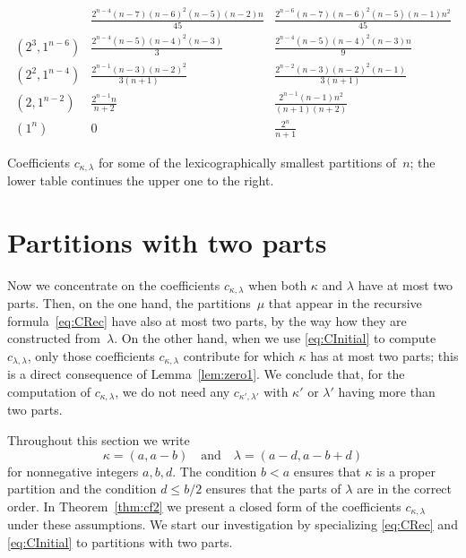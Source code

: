 \documentclass[10pt,oneside,american]{amsart}
\numberwithin{equation}{section}
\numberwithin{figure}{section}
\theoremstyle{plain}
\theoremstyle{definition}
\theoremstyle{remark}
\theoremstyle{plain}
\theoremstyle{definition}
\theoremstyle{plain}
\theoremstyle{plain}
\begin{document}
\begin{table}[H]
\[\begin{array}{c|cc}
    & \frac{2^{n-4} (n-7) (n-6)^2 (n-5) (n-2) n}{45}
    & \frac{2^{n-6} (n-7) (n-6)^2 (n-5) (n-1) n^2}{45}
    \\[1ex]
    (2^3,1^{n-6})
    & \frac{2^{n-4} (n-5) (n-4)^2 (n-3)}{3}
    & \frac{2^{n-4} (n-5) (n-4)^2 (n-3) n}{9}
    \\[1ex]
    (2^2,1^{n-4})
    & \frac{2^{n-1} (n-3) (n-2)^2}{3 (n+1)}
    & \frac{2^{n-2} (n-3) (n-2)^2 (n-1)}{3 (n+1)}
    \\[1ex]
    (2,1^{n-2})
    & \frac{2^{n-1} n}{n+2}
    & \frac{2^{n-1} (n-1) n^2}{(n+1) (n+2)}
    \\[1ex]
    (1^n)
    & 0 & \frac{2^n}{n+1}
\end{array}
\]
\caption{Coefficients $c_{\kappa,\lambda}$ for some of the lexicographically
  smallest partitions of~$n$; the lower table continues the upper one to the
  right.}
\label{tab:cn2}
\end{table}


\section{Partitions with two parts}

Now we concentrate on the coefficients $c_{\kappa,\lambda}$ when both $\kappa$
and $\lambda$ have at most two parts. Then, on the one hand, the
partitions~$\mu$ that appear in the recursive formula~\eqref{eq:CRec} have
also at most two parts, by the way how they are constructed from~$\lambda$. On
the other hand, when we use \eqref{eq:CInitial} to compute
$c_{\lambda,\lambda}$, only those coefficients $c_{\kappa,\lambda}$ contribute
for which $\kappa$ has at most two parts; this is a direct consequence of
Lemma~\ref{lem:zero1}.  We conclude that, for the computation of
$c_{\kappa,\lambda}$, we do not need any $c_{\kappa',\lambda'}$ with $\kappa'$
or $\lambda'$ having more than two parts.

\noindent
Throughout this section we write
\[
  \kappa=(a,a-b) \quad\text{and}\quad \lambda=(a-d,a-b+d)
\]
for nonnegative integers $a,b,d$.  The condition $b<a$ ensures that $\kappa$
is a proper partition and the condition $d\leq b/2$ ensures that the
parts of $\lambda$ are in the correct order. In Theorem~\ref{thm:cf2} we
present a closed form of the coefficients $c_{\kappa,\lambda}$ under these
assumptions. We start our investigation by specializing
 \eqref{eq:CRec} and \eqref{eq:CInitial} to partitions with two
parts.
\end{document}
